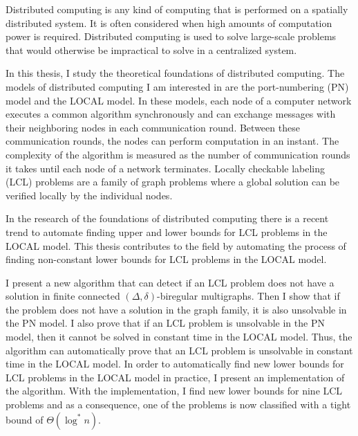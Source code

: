 \begin{abstractpage}[english]
Distributed computing is any kind of computing that is performed on a spatially distributed system.
It is often considered when high amounts of computation power is required.
Distributed computing is used to solve large-scale problems that would otherwise be impractical to solve in a centralized system.

In this thesis, I study the theoretical foundations of distributed computing.
The models of distributed computing I am interested in are the port-numbering (PN) model and the LOCAL model.
In these models, each node of a computer network executes a common algorithm synchronously and can exchange messages with their neighboring nodes in each communication round.
Between these communication rounds, the nodes can perform computation in an instant.
The complexity of the algorithm is measured as the number of communication rounds it takes until each node of a network terminates.
Locally checkable labeling (LCL) problems are a family of graph problems where a global solution can be verified locally by the individual nodes.

In the research of the foundations of distributed computing there is a recent trend to automate finding upper and lower bounds for LCL problems in the LOCAL model.
This thesis contributes to the field by automating the process of finding non-constant lower bounds for LCL problems in the LOCAL model.

I present a new algorithm that can detect if an LCL problem does not have a solution in finite connected $(\Delta, \delta)$-biregular multigraphs.
Then I show that if the problem does not have a solution in the graph family, it is also unsolvable in the PN model.
I also prove that if an LCL problem is unsolvable in the PN model, then it cannot be solved in constant time in the LOCAL model.
Thus, the algorithm can automatically prove that an LCL problem is unsolvable in constant time in the LOCAL model.
In order to automatically find new lower bounds for LCL problems in the LOCAL model in practice, I present an implementation of the algorithm.
With the implementation, I find new lower bounds for nine LCL problems and as a consequence, one of the problems is now classified with a tight bound of $\Theta(\log^* n)$.

\end{abstractpage}
